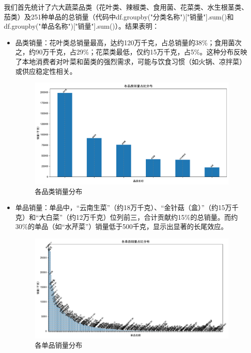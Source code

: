 \documentclass{cumcmthesis} %
\begin{document}
我们首先统计了六大蔬菜品类（花叶类、辣椒类、食用菌、花菜类、水生根茎类、茄类）及251种单品的总销量（代码中df.groupby("分类名称")["销量"].sum()和df.groupby("单品名称")["销量"].sum()）。结果表明：
\begin{itemize}
    \item 品类销量：花叶类总销量最高，达约120万千克，占总销量的38\%；食用菌次之，约90万千克，占29\%；花菜类最低，仅约15万千克，占5\%。这种分布反映了本地消费者对叶菜和菌类的强烈需求，可能与饮食习惯（如火锅、凉拌菜）或供应稳定性相关。
    \begin{figure}[H]
        \centering
        \includegraphics[width= 1.2\textwidth]{fig/category_sales.pdf}
        \caption{各品类销量分布}
    \end{figure}


    \item 单品销量：单品中，“云南生菜”（约18万千克）、“金针菇（盒）”（约15万千克）和“大白菜”（约12万千克）位列前三，合计贡献约15\%的总销量。而约30\%的单品（如“水芹菜”）销量低于500千克，显示出显著的长尾效应。
    \begin{figure}[H]
        \centering
        \includegraphics[width= 1.2\textwidth]{fig/item_sales.pdf}
        \caption{各单品销量分布}
    \end{figure}
\end{itemize}
\end{document}
